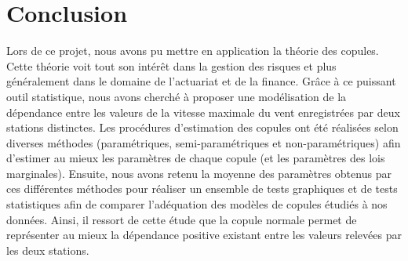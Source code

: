\section*{Conclusion}

Lors de ce projet, nous avons pu mettre en application la théorie des copules. Cette théorie voit tout son intérêt dans la gestion des risques et plus généralement dans le domaine de l'actuariat et de la finance. Grâce à ce puissant outil statistique, nous avons cherché à proposer une modélisation de la dépendance entre les valeurs de la vitesse maximale du vent enregistrées par deux stations distinctes. Les procédures d'estimation des copules ont été réalisées selon diverses méthodes (paramétriques, semi-paramétriques et non-paramétriques) afin d'estimer au mieux les paramètres de chaque copule (et les paramètres des lois marginales). Ensuite, nous avons retenu la moyenne des paramètres obtenus par ces différentes méthodes pour réaliser un ensemble de tests graphiques et de tests statistiques afin de comparer l'adéquation des modèles de copules étudiés à nos données. Ainsi, il ressort de cette étude que la copule normale permet de représenter au mieux la dépendance positive existant entre les valeurs relevées par les deux stations.



